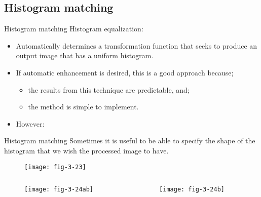 
\subsection{Histogram matching}


\begin{frame}{Histogram matching}
Histogram equalization:
\begin{itemize}
\item Automatically determines a transformation function that seeks to produce an output image that has a uniform histogram.
\item If automatic enhancement is desired, this is a good approach because;
\begin{itemize}
\item the results from this technique are predictable, and;
\item the method is simple to implement.
\end{itemize}
\item However:
\end{itemize}
\begin{block}{Histogram matching}
Sometimes it is useful to be able to specify the shape of the histogram that we wish the
processed image to have.
\end{block}
\end{frame}



\begin{frame}
\begin{figure}
\centering
\texttt{[image: fig-3-23]}
\end{figure}
\end{frame}


\begin{frame}
\begin{columns}
\begin{column}{.5\textwidth}
\begin{figure}
\centering
\texttt{[image: fig-3-24ab]}
\end{figure}
\end{column}
\begin{column}{.5\textwidth}
\begin{figure}
\centering
\texttt{[image: fig-3-24b]}
\end{figure}
\end{column}
\end{columns}
\end{frame}

